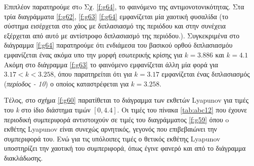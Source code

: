 Επιπλέον παρατηρούμε στo Σχ. \ref{f:g64}, το φαινόμενο της αντιμονοτονικότητας. Στα τρία διαγράμματα \ref{f:g62}, \ref{f:g63} \ref{f:g64} εμφανίζεται μία χαοτική φυσαλίδα (το σύστημα εισέρχεται στο χάος με διπλασιασμό της περιόδου και στην συνέχεια εξέρχεται από αυτό με αντίστροφο διπλασιασμό της περιόδου.). Συγκεκριμένα στο διάγραμμα \ref{f:g64} παρατηρούμε ότι ενδιάμεσα του βασικού ορθού διπλασιασμόυ εμφανίζεται ένας ακόμα υπο την μορφή εσωτερικής κρίσης για $k=3.886$ και $k=4.1$ Ακόμη στο διάγραμμα \ref{f:g63} το φαινόμενο εμφανίζεται άλλη μία φορά για $3.17<k<3.258$, όπου παρατηρείται ότι για $k=3.17$ εμφανίζεται ένας διπλασιασμός (\emph{περίοδος - 10}) ο οποίος καταστρέφεται για $k=3.258$.

Τέλος, στο σχήμα \ref{f:g60} παρατίθεται το διάγραμμα των εκθετών Lyapunov για τιμές του \emph{k} στο ίδιο διάστημα τιμών $[0, 4.4]$. Οι τιμές του πίνακα \ref{tab:abc12} που έχουνε περιοδική συμπεριφορά αντιστοιχούν σε τιμές του διαγράμματος \ref{f:g59} όπου o εκθέτης Lyapunov είναι συνεχώς αρνητικός, γεγονός που επιβεβαιώνει την συμπεριφορά του. Ενώ για τις υπόλοιπες τιμές ο θετικός εκθέτης Lyapunov υποστηρίζει την χαοτική του συμπεριφορά, όπως έγινε φανερό και από το διάγραμμα διακλάδωσης.\\\\


